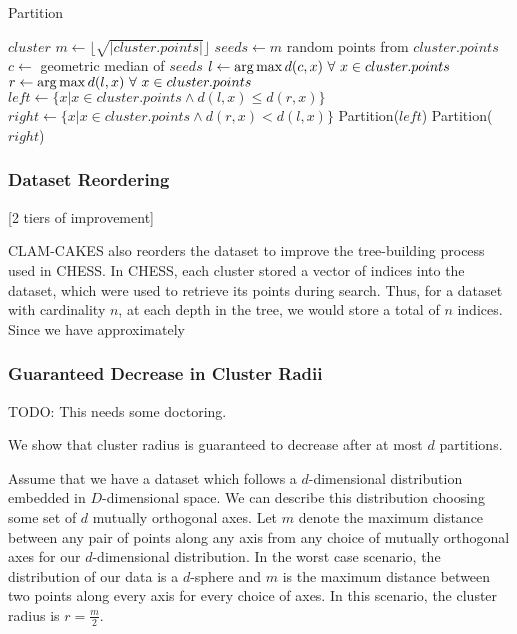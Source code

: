 \begin{algorithm} %
\caption{Partition} %
\label{alg:partition} %
\begin{algorithmic}[1] %
    \REQUIRE $cluster$
    \STATE $m \leftarrow \lfloor \sqrt{|cluster.points|} \rfloor$
    \STATE $seeds \leftarrow m$ random points from $cluster.points$
    \STATE $c \leftarrow$ geometric median of $seeds$
    \STATE $l \leftarrow \operatorname*{arg\,max} d(c,x) \ \forall \ x \in cluster.points$
    \STATE $r \leftarrow \operatorname*{arg\,max} d(l,x) \ \forall \ x \in cluster.points$
    \STATE $left \leftarrow \{x | x \in cluster.points \land d(l,x) \le d(r,x)\}$
    \STATE $right \leftarrow \{x | x \in cluster.points \land d(r,x) < d(l,x)\}$
        \STATE Partition($left$)
    \ENDIF
        \STATE Partition($right$)
    \ENDIF
\end{algorithmic}
\end{algorithm}

\subsubsection {Dataset Reordering}

[2 tiers of improvement]

CLAM-CAKES also reorders the dataset to improve the tree-building process 
used in CHESS. In CHESS, each cluster stored a vector of indices into the dataset, which 
were used to retrieve its points during search. Thus, for a dataset with cardinality $n$, 
at each depth in the tree, we would store a total of $n$ indices. Since we have approximately 


\subsubsection {Guaranteed Decrease in Cluster Radii}
\label{subsubsec:methods:guaranteed-decrease-in-cluster-radii}

TODO: This needs some doctoring. 

We show that cluster radius is guaranteed to decrease after at most $d$ partitions.

Assume that we have a dataset which follows a $d$-dimensional distribution embedded in $D$-dimensional space.
We can describe this distribution choosing some set of $d$ mutually orthogonal axes.
Let $m$ denote the maximum distance between any pair of points along any axis from any choice of mutually orthogonal axes for our $d$-dimensional distribution.
In the worst case scenario, the distribution of our data is a $d$-sphere and $m$ is the maximum distance between two points along every axis for every choice of axes.
In this scenario, the cluster radius is $r = \frac{m}{2}$.

